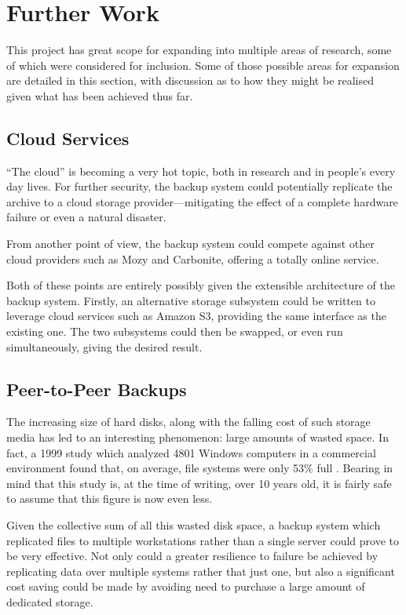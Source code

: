 \chapter{Further Work}
\label{chap:further-work}

This project has great scope for expanding into multiple areas of research,
some of which were considered for inclusion. Some of those possible areas for
expansion are detailed in this section, with discussion as to how they might be
realised given what has been achieved thus far.

\section{Cloud Services}

``The cloud'' is becoming a very hot topic, both in research and in people's
every day lives. For further security, the backup system could potentially
replicate the archive to a cloud storage provider---mitigating the effect of
a complete hardware failure or even a natural disaster.

From another point of view, the backup system could compete against other cloud
providers such as Mozy and Carbonite, offering a totally online service.

Both of these points are entirely possibly given the extensible architecture of
the backup system. Firstly, an alternative storage subsystem could be written
to leverage cloud services such as Amazon S3, providing the same interface as
the existing one. The two subsystems could then be swapped, or even run
simultaneously, giving the desired result.

\section{Peer-to-Peer Backups}

The increasing size of hard disks, along with the falling cost of such storage
media has led to an interesting phenomenon: large amounts of wasted space. In
fact, a 1999 study which analyzed 4801 Windows computers in a commercial
environment found that, on average, file systems were only 53\% full
\cite{douceur1999}. Bearing in mind that this study is, at the time of writing,
over 10 years old, it is fairly safe to assume that this figure is now even less.

Given the collective sum of all this wasted disk space, a backup system which
replicated files to multiple workstations rather than a single server could
prove to be very effective. Not only could a greater resilience to failure be
achieved by replicating data over multiple systems rather that just one, but
also a significant cost saving could be made by avoiding need to purchase
a large amount of dedicated storage.


